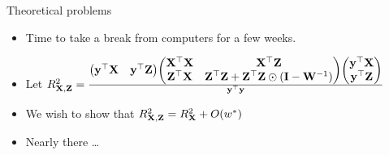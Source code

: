\documentclass{beamer}
\begin{document}
\begin{frame}{Theoretical problems}
\begin{itemize}
\item Time to take a break from computers for a few weeks.
\item Let $R^2_{{\bf X}, {\bf Z}} = \frac{
\begin{pmatrix}
{\bf y}^\top {\bf X} & {\bf y}^\top {\bf Z}
\end{pmatrix}
\begin{pmatrix}
{\bf X}^\top {\bf X} & {\bf X}^\top {\bf Z} \\
{\bf Z}^\top {\bf X} & {\bf Z}^\top {\bf Z} + {\bf Z}^\top {\bf Z} \odot ({\bf I} - {\bf W}^{-1})
\end{pmatrix}
\begin{pmatrix}
{\bf y}^\top {\bf X}\\
{\bf y}^\top {\bf Z}
\end{pmatrix}
}{{\bf y}^\top {\bf y}}$
\item We wish to show that $R^2_{{\bf X}, {\bf Z}} = R^2_{\bf X} + O(w^*)$
\item Nearly there \ldots
\end{itemize}
\end{frame}
\end{document}
